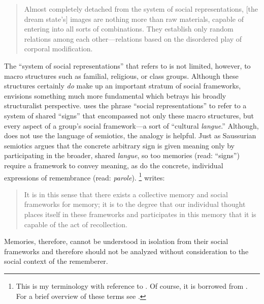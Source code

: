 \begin{quote}
    Almost completely detached from the system of social representations, {[}the dream state's{]} images are nothing more than raw materials, capable of entering into all sorts of combinations. They establish only random relations among each other---relations based on the disordered play of corporal modification.\autocite[42]{halbwachs1992}
\end{quote}  

The ``system of social representations'' that \halbwachs refers to is not limited, however, to macro structures such as familial, religious, or class groups. Although these structures certainly \emph{do} make up an important stratum of social frameworks, \halbwachs envisions something much more fundamental which betrays his broadly structuralist perspective. \halbwachs uses the phrase ``social representations'' to refer to a system of shared ``signs'' that encompassed not only these macro structures, but every aspect of a group's social framework---a sort of ``cultural \emph{langue}.'' Although, \halbwachs does not use the language of semiotics, the analogy is helpful. Just as Saussurian semiotics argues that the concrete arbitrary sign is given meaning only by participating in the broader, shared \emph{langue}, so too memories (read: ``signs'') require a framework to convey meaning, as do the concrete, individual expressions of remembrance (read: \emph{parole}).%
%
\footnote{This is my terminology with reference to \halbwachs. Of course, it is borrowed from \cite{saussure1916}. For a brief overview of these terms see \cite[93--94]{smith-riley2009}.}
%
\halbwachs writes:  

\begin{quote}
    It is in this sense that there exists a collective memory and social frameworks for memory; it is to the degree that our individual thought places itself in these frameworks and participates in this memory that it is capable of the act of recollection.\autocite[38]{halbwachs1992}
\end{quote}  

Memories, therefore, cannot be understood in isolation from their social frameworks and therefore should not be analyzed without consideration to the social context of the rememberer.  

